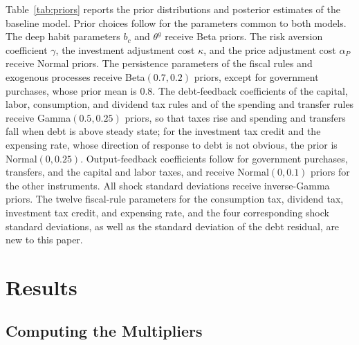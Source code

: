 \documentclass[article,11pt,letterpaper,fleqn]{article}
\theoremstyle{definition}
\numberwithin{equation}{section}
\begin{document}
Table~\ref{tab:priors} reports the prior distributions and posterior estimates of the baseline model. Prior choices follow \citet{Zubairy2014} for the parameters common to both models. The deep habit parameters $b_c$ and $\theta^g$ receive Beta priors. The risk aversion coefficient $\gamma$, the investment adjustment cost $\kappa$, and the price adjustment cost $\alpha_P$ receive Normal priors. The persistence parameters of the fiscal rules and exogenous processes receive Beta$(0.7, 0.2)$ priors, except for government purchases, whose prior mean is 0.8. The debt-feedback coefficients of the capital, labor, consumption, and dividend tax rules and of the spending and transfer rules receive Gamma$(0.5, 0.25)$ priors, so that taxes rise and spending and transfers fall when debt is above steady state; for the investment tax credit and the expensing rate, whose direction of response to debt is not obvious, the prior is Normal$(0, 0.25)$. Output-feedback coefficients follow \citet{Zubairy2014} for government purchases, transfers, and the capital and labor taxes, and receive Normal$(0, 0.1)$ priors for the other instruments. All shock standard deviations receive inverse-Gamma priors. The twelve fiscal-rule parameters for the consumption tax, dividend tax, investment tax credit, and expensing rate, and the four corresponding shock standard deviations, as well as the standard deviation of the debt residual, are new to this paper.


\section{Results}
\label{sec:results}

\subsection{Computing the Multipliers}
\end{document}
